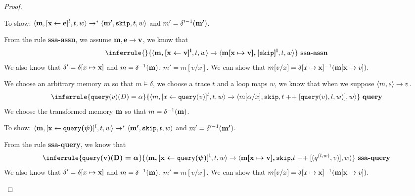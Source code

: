 \documentclass[a4paper,11pt]{article}
\begin{document}
\begin{proof}
\begin{itemize}
 To show: $\langle \boldsymbol{\mathbf{m}}, [\mathrel{ \boldsymbol{\mathbf{x}} \leftarrow  \boldsymbol{\mathbf{e}} }]^{l} , t, w \rangle \to^{*} \langle \boldsymbol{\mathbf{m'}}, \mathtt{skip}, t, w \rangle $ and $ m' = \delta'^{-1}(\boldsymbol{\mathbf{m'}}) $.
 
 From the rule \textbf{ssa-assn}, we assume $\boldsymbol{\mathbf{m}}, \boldsymbol{\mathbf{e}} \to \boldsymbol{\mathbf{v}}$, we know that 
 \[
 \inferrule
{
}
{
\config{\ssa{ m, [\assign x v]^{l}},  t,w } \xrightarrow{} \config{\ssa{m[x \mapsto v], [\eskip]^{l}}, t,w }
}
~\textbf{ssa-assn}
 \]
 We also know that $\delta'= \delta[x \mapsto \boldsymbol{\mathbf{x}}]$ and $m = \delta^{-1}(\boldsymbol{\mathbf{m}})$, $m'= m[v/x]$. We can show that $ m[v/x] = \delta[x \mapsto \boldsymbol{\mathbf{x}}]^{-1}(\boldsymbol{\mathbf{m}}[\boldsymbol{\mathbf{x}} \mapsto v]) $.
 
We choose an arbitrary memory $m$ so that $m \vDash \delta$, we choose a trace $t$ and a loop maps $w$, we know that when we suppose $\langle m, e \rangle \to v$.
 \[
\inferrule
{
\query(v)(D) = \qval 
}
{
\config{m, [\assign{x}{\query(v)}]^l, t, w} \xrightarrow{} \config{m[ \qval/ x], \eskip,  t \mathrel{++} [\query(v),l,w )],w }
}
~\textbf{query}
 \]
 We choose the transformed memory ${\boldsymbol{\mathbf{m}}} $ so that  $ m =\delta^{-1}(\boldsymbol{\mathbf{m}})$.
 
 To show: $\langle \boldsymbol{\mathbf{m}}, [\mathrel{ \boldsymbol{\mathbf{x}} \leftarrow  \boldsymbol{\mathbf{{\tt query}(\psi)}} }]^{l} , t, w \rangle \to^{*} \langle \boldsymbol{\mathbf{m'}}, \mathtt{skip}, t, w \rangle $ and $ m' = \delta'^{-1}(\boldsymbol{\mathbf{m'}}) $.
 
 From the rule \textbf{ssa-query}, we know that 
 \[
 \inferrule
{
\ssa{\query(v)(D) = \qval} 
}
{
\config{ \ssa{ m, [\assign{\ssa{x}}{\ssa{\query(\qexpr)}}]^l}, t, w} \xrightarrow{} \config{\ssa{  m[  x \mapsto v], \eskip,}  t \mathrel{++} [(q^{(l,w )},v)],w }
}
~\textbf{ssa-query}
 \]
 We also know that $\delta'= \delta[x \mapsto \boldsymbol{\mathbf{x}}]$ and $m = \delta^{-1}(\boldsymbol{\mathbf{m}})$, $m'= m[v/x]$. We can show that $ m[v/x] = \delta[x \mapsto \boldsymbol{\mathbf{x}}]^{-1}(\boldsymbol{\mathbf{m}}[\boldsymbol{\mathbf{x}} \mapsto v]) $.


\end{itemize}
\end{proof}
\end{document}
